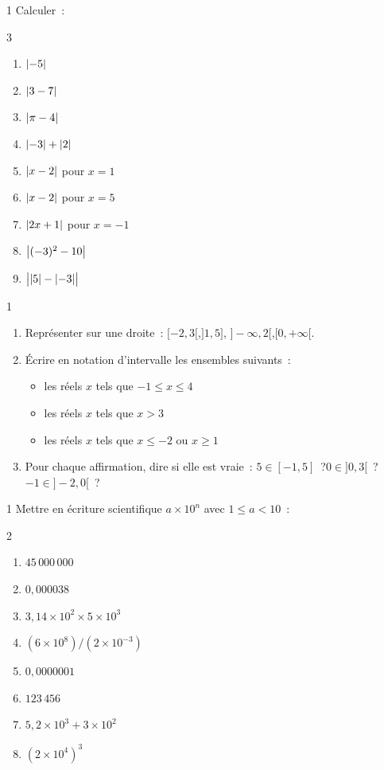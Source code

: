 \begin{exo}{1}
Calculer~:
\begin{multicols}{3}
\begin{enumerate}
  \item $\left|-5\right|$
  \item $\left|3-7\right|$
  \item $\left|\pi-4\right|$
  \item $\left|-3\right|+\left|2\right|$
  \item $\left|x-2\right|$ pour $x=1$
  \item $\left|x-2\right|$ pour $x=5$
  \item $\left|2x+1\right|$ pour $x=-1$
  \item $\left|(-3)^2-10\right|$
  \item $\bigl|\left|5\right|-\left|-3\right|\bigr|$
\end{enumerate}
\end{multicols}
\end{exo}

\begin{exo}{1}
\begin{enumerate}
  \item Repr\'esenter sur une droite~: $[-2,3[$,\quad $]1,5]$,\quad
        $]-\infty,2[$,\quad $[0,+\infty[$.
  \item \'Ecrire en notation d'intervalle les ensembles suivants~:
        \begin{itemize}
          \item les r\'eels $x$ tels que $-1 \leq x \leq 4$
          \item les r\'eels $x$ tels que $x > 3$
          \item les r\'eels $x$ tels que $x \leq -2$ ou $x \geq 1$
        \end{itemize}
  \item Pour chaque affirmation, dire si elle est vraie~:
        $5 \in [-1,5]$~?\quad $0 \in ]0,3[$~?\quad $-1 \in ]-2,0[$~?
\end{enumerate}
\end{exo}

\begin{exo}{1}
Mettre en \'ecriture scientifique $a\times10^n$ avec $1\leq a < 10$~:
\begin{multicols}{2}
\begin{enumerate}
  \item $45\,000\,000$
  \item $0{,}000038$
  \item $3{,}14 \times 10^2 \times 5 \times 10^3$
  \item $(6 \times 10^8)/(2 \times 10^{-3})$
  \item $0{,}0000001$
  \item $123\,456$
  \item $5{,}2\times10^3 + 3\times10^2$
  \item $(2\times10^4)^3$
\end{enumerate}
\end{multicols}
\end{exo}

